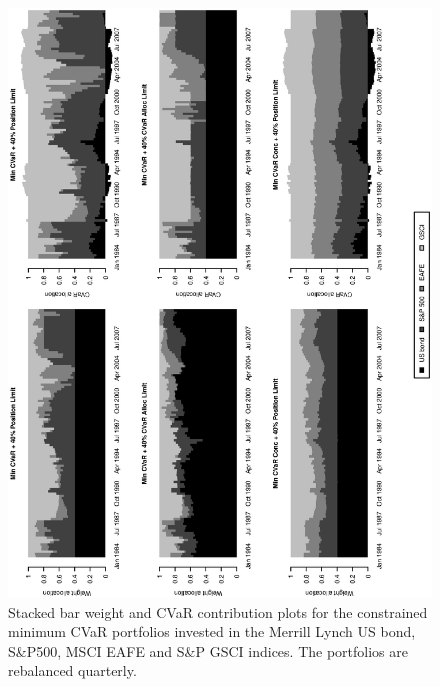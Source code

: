 \documentclass[11pt]{article}
\begin{document}
\begin{figure}[tb]
\begin{center}
\caption{Stacked bar weight and CVaR contribution plots for the constrained minimum CVaR portfolios invested in the Merrill Lynch US bond, S\&P500, MSCI EAFE and S\&P GSCI indices. The portfolios are rebalanced quarterly.}
\includegraphics[width=12cm,angle=270]{MinCVaR_alternatives.eps}
\end{center}
\end{figure}



\newpage
\end{document}
